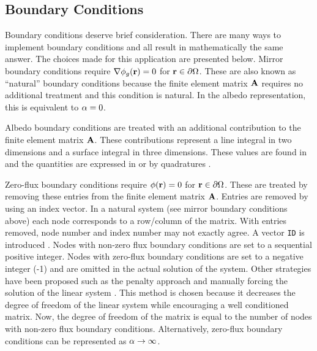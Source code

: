   \subsection{Boundary Conditions}
    \label{sec:boundary_conditions}
    Boundary conditions deserve brief consideration. There are many ways to 
    implement boundary conditions and all result in mathematically the same 
    answer. The choices made for this application are presented below. Mirror 
    boundary conditions require $\mathbf{\nabla} \phi_g(\mathbf{r}) = 0$ for 
    $\mathbf{r} \in \partial \Omega$. These are also known as ``natural'' boundary
    conditions because the finite element matrix $\mathbf{A}$ requires no additional 
    treatment and this condition is natural. In the albedo representation, this
    is equivalent to $\alpha = 0$.
    
    Albedo boundary conditions are treated with an additional contribution to 
    the finite element matrix $\mathbf{A}$. These contributions represent a line 
    integral in two dimensions and a surface integral in three dimensions. These
    values are found in  and the quantities are 
    expressed in  or by quadratures 
    .
    
    Zero-flux boundary conditions require $\phi(\mathbf{r}) = 0$ for 
    $\mathbf{r} \in \partial \Omega$. These are treated by removing these entries from
    the finite element matrix $\mathbf{A}$. Entries are removed by using an index 
    vector. In a natural system (see mirror boundary conditions above) each node
    corresponds to a row/column of the matrix. With entries removed, node number
    and index number may not exactly agree. A vector \texttt{ID} is introduced
    \cite{textbookjohnson}. Nodes with non-zero flux boundary conditions are set
    to a sequential positive integer. Nodes with zero-flux boundary conditions 
    are set to a negative integer (-1) and are omitted in the actual solution of 
    the system. Other strategies have been proposed such as the penalty approach 
    \cite{textbookhughes} and manually forcing the solution of the linear system 
    \cite{textbookli}. This method is chosen because it decreases the degree of 
    freedom of the linear system while encouraging a well conditioned matrix. 
    Now, the degree of freedom of the matrix is equal to the number of nodes 
    with non-zero flux boundary conditions. Alternatively, zero-flux boundary
    conditions can be represented as $\alpha \rightarrow \infty$.
    
